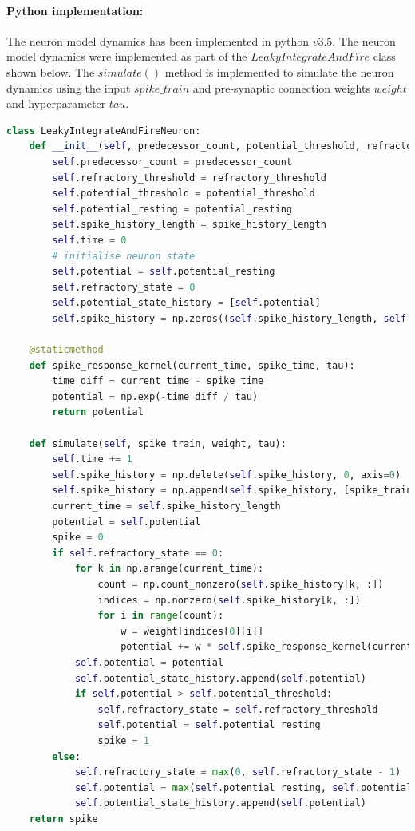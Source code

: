 \paragraph{Python implementation:} The neuron model dynamics has been implemented in python $v3.5$. The neuron model dynamics were implemented as part of the $LeakyIntegrateAndFire$ class shown below. The $simulate()$ method is implemented to simulate the neuron dynamics using the input $spike\_train$ and pre-synaptic connection weights $weight$ and hyperparameter $tau$.
\begin{lstlisting}[language=Python, caption={Python code for NeuCube modified SRM neuron model}]
class LeakyIntegrateAndFireNeuron:
	def __init__(self, predecessor_count, potential_threshold, refractory_threshold, potential_resting, spike_history_length):
		self.predecessor_count = predecessor_count
		self.refractory_threshold = refractory_threshold
		self.potential_threshold = potential_threshold
		self.potential_resting = potential_resting
		self.spike_history_length = spike_history_length
		self.time = 0
		# initialise neuron state
		self.potential = self.potential_resting
		self.refractory_state = 0
		self.potential_state_history = [self.potential]
		self.spike_history = np.zeros((self.spike_history_length, self.predecessor_count), dtype=int)

	@staticmethod
	def spike_response_kernel(current_time, spike_time, tau):
		time_diff = current_time - spike_time
		potential = np.exp(-time_diff / tau)
		return potential

	def simulate(self, spike_train, weight, tau):
		self.time += 1
		self.spike_history = np.delete(self.spike_history, 0, axis=0)
		self.spike_history = np.append(self.spike_history, [spike_train], axis=0)
		current_time = self.spike_history_length
		potential = self.potential
		spike = 0
		if self.refractory_state == 0:
			for k in np.arange(current_time):
				count = np.count_nonzero(self.spike_history[k, :])
				indices = np.nonzero(self.spike_history[k, :])
				for i in range(count):
					w = weight[indices[0][i]]
					potential += w * self.spike_response_kernel(current_time=current_time - 1, spike_time=k, tau=tau)
			self.potential = potential
			self.potential_state_history.append(self.potential)
			if self.potential > self.potential_threshold:
				self.refractory_state = self.refractory_threshold
				self.potential = self.potential_resting
				spike = 1
		else:
			self.refractory_state = max(0, self.refractory_state - 1)
			self.potential = max(self.potential_resting, self.potential)
			self.potential_state_history.append(self.potential)
	return spike
	
\end{lstlisting}

